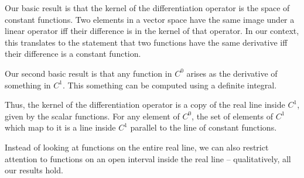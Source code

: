\documentclass[10pt]{amsart}
\begin{document}
Our basic result is that the kernel of the differentiation operator is
the space of constant functions. Two elements in a vector space have
the same image under a linear operator iff their difference is in the
kernel of that operator. In our context, this translates to the
statement that two functions have the same derivative iff their
difference is a constant function.

Our second basic result is that any function in $C^0$ arises as the
derivative of something in $C^1$. This something can be computed using
a definite integral.

Thus, the kernel of the differentiation operator is a copy of the real
line inside $C^1$, given by the scalar functions. For any element of
$C^0$, the set of elements of $C^1$ which map to it is a line inside
$C^1$ parallel to the line of constant functions.

Instead of looking at functions on the entire real line, we can also
restrict attention to functions on an open interval inside the real
line -- qualitatively, all our results hold.
\end{document}

